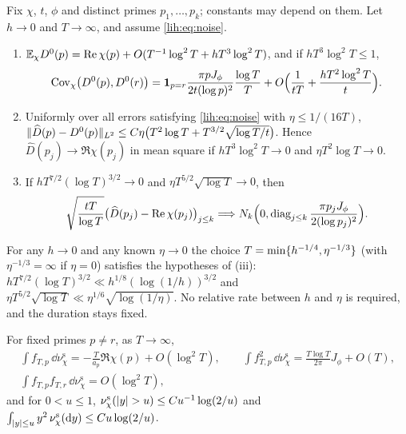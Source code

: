 \begin{theorem}\label{lih:thm:noisy}
Fix $\chi$, $t$, $\phi$ and distinct primes $p_1,\dots,p_k$; constants may depend on them. Let $h\to0$ and
$T\to\infty$, and assume \eqref{lih:eq:noise}.
\begin{enumerate}[label=\textup{(\roman*)}]
\item $\liEx_\chi D^0(p)=\Re\chi(p)+O(T^{-1}\log^2T+hT^3\log^2T)$, and if $hT^3\log^2T\le1$,
\[
 \operatorname{Cov}_\chi\bigl(D^0(p),D^0(r)\bigr)=\mathbf 1_{p=r}\frac{\pi pJ_\phi}{2t(\log p)^2}\frac{\log T}T
 +O\Bigl(\frac1{tT}+\frac{hT^2\log^2T}t\Bigr).
\]
\item Uniformly over all errors satisfying \eqref{lih:eq:noise} with $\eta\le1/(16T)$,
$\norm{\widehat D(p)-D^0(p)}_{L^2}\le C\eta\bigl(T^2\log T+T^{3/2}\sqrt{\log T/t}\bigr)$. Hence
$\widehat D(p_j)\to\Re\chi(p_j)$ in mean square if $hT^3\log^2T\to0$ and $\eta T^2\log T\to0$.
\item If $hT^{7/2}(\log T)^{3/2}\to0$ and $\eta T^{5/2}\sqrt{\log T}\to0$, then
\[
 \sqrt{\frac{tT}{\log T}}\bigl(\widehat D(p_j)-\Re\chi(p_j)\bigr)_{j\le k}\Longrightarrow
 N_k\Bigl(0,\operatorname{diag}_{j\le k}\frac{\pi p_jJ_\phi}{2(\log p_j)^2}\Bigr).
\]
\end{enumerate}
\end{theorem}

For any $h\to0$ and any known $\eta\to0$ the choice $T=\min\set{h^{-1/4},\eta^{-1/3}}$ (with $\eta^{-1/3}=\infty$ if
$\eta=0$) satisfies the hypotheses of (iii): $hT^{7/2}(\log T)^{3/2}\ll h^{1/8}(\log(1/h))^{3/2}$ and
$\eta T^{5/2}\sqrt{\log T}\ll\eta^{1/6}\sqrt{\log(1/\eta)}$. No relative rate between $h$ and $\eta$ is required, and
the duration stays fixed.

\begin{lemma}\label{lih:lem:noisymoments}
For fixed primes $p\ne r$, as $T\to\infty$,
\[
 \begin{gathered}
 \int f_{T,p}\,\dd\nu^{\mathrm s}_\chi=-\frac T{a_p}\Re\chi(p)+O(\log^2T),\qquad
 \int f_{T,p}^2\,\dd\nu^{\mathrm s}_\chi=\frac{T\log T}{2\pi}J_\phi+O(T),\\
 \int f_{T,p}f_{T,r}\,\dd\nu^{\mathrm s}_\chi=O(\log^2T),
 \end{gathered}
\]
and for $0<u\le1$, $\nu^{\mathrm s}_\chi(\abs y>u)\le Cu^{-1}\log(2/u)$ and $\int_{\abs y\le u}y^2\,\nu^{\mathrm s}_\chi(\dd y)\le Cu\log(2/u)$.
\end{lemma}

